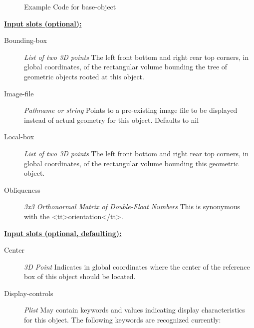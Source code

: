 \documentclass [11pt]{book}
\begin{document}
\begin{itemize}
\begin{figure}
\begin{lrbox}{\boxedverb}
\begin{minipage}{\linewidth}
{\begin{verbatim}
\end{verbatim}}
\end{minipage}
\end{lrbox}
\fbox{\usebox{\boxedverb}}

\caption{Example Code for base-object}

\label{fig:example-code-base-object}

\end{figure}





\textbf{
\underline{Input slots (optional):}}

\begin{description}

\item [Bounding-box]
\emph{List of two 3D points} The left front bottom and right rear top corners, in global coordinates,
of the rectangular volume bounding the tree of geometric objects rooted at this object.


\item [Image-file]
\emph{Pathname or string} Points to a pre-existing image file to be displayed instead of actual geometry for this object. Defaults to nil


\item [Local-box]
\emph{List of two 3D points} The left front bottom and right rear top corners, in global coordinates,
of the rectangular volume bounding this geometric object.


\item [Obliqueness]
\emph{3x3 Orthonormal Matrix of Double-Float Numbers} This is synonymous with the <tt>orientation</tt>.


\end{description}






\textbf{
\underline{Input slots (optional, defaulting):}}

\begin{description}

\item [Center]
\emph{3D Point} Indicates in global coordinates where the center of the reference
box of this object should be located.


\item [Display-controls]
\emph{Plist} May contain keywords and values indicating display characteristics for
this object. The following keywords are recognized currently:


\end{description}
\end{itemize}
\end{document}
